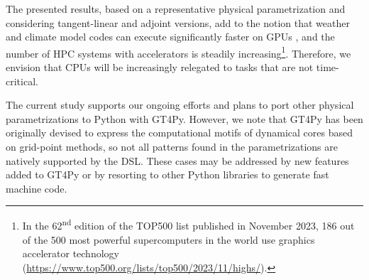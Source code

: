 \documentclass[main.tex]{subfiles}
\begin{document}
        The presented results, based on a representative physical parametrization and considering tangent-linear and adjoint versions, add to the notion that weather and climate model codes can execute significantly faster on GPUs \citep{fuhrer18}, and the number of HPC systems with accelerators is steadily increasing\footnote{In the 62\textsuperscript{nd} edition of the TOP500 list published in November 2023, 186 out of the 500 most powerful supercomputers in the world use graphics accelerator technology (\url{https://www.top500.org/lists/top500/2023/11/highs/}).}. Therefore, we envision that CPUs will be increasingly relegated to tasks that are not time-critical.
    
    
        The current study supports our ongoing efforts and plans to port other physical parametrizations to Python with GT4Py. However, we note that GT4Py has been originally devised to express the computational motifs of dynamical cores based on grid-point methods, so not all patterns found in the parametrizations are natively supported by the DSL. These cases may be addressed by new features added to GT4Py or by resorting to other Python libraries to generate fast machine code.
        
    
    \biblio
\end{document}
